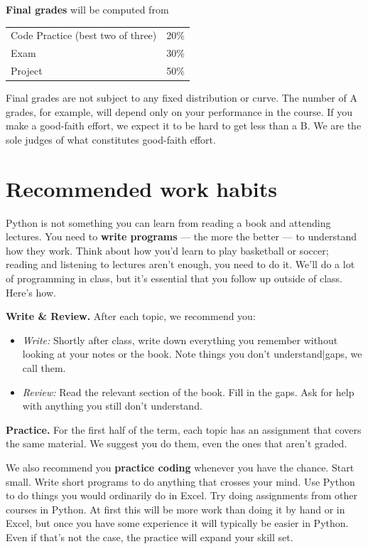 {\bf Final grades\/} will be computed from
\begin{center}
\begin{tabular}{ll}
Code Practice (best two of three) & 20\% \\
Exam        & 30\% \\
Project     & 50\% \\
\end{tabular}
\end{center}

Final grades are not subject to any fixed distribution or curve.
The number of A grades, for example,
will depend only on your performance in the course.
If you make a good-faith effort,
we expect it to be hard to get less than a B.
We are the sole judges of what constitutes good-faith effort.


\section*{Recommended work habits}

Python is not something you can learn from reading a book and attending lectures.
You need to {\bf write programs\/} ---
the more the better --- to understand how they work.
Think about how you'd learn to play basketball or soccer;
reading and listening to lectures aren't enough, you need to do it.
We'll do a lot of programming in class, but it's {essential\/} that you
follow up outside of class.
Here's how.

{\bf Write \& Review.\/}
After each topic, we recommend you:
\begin{itemize}
\item {\it Write:\/}  Shortly after class, write down everything you remember
without looking at your notes or the book. Note things you don't understand|gaps, we call them.

\item {\it Review:\/} Read the relevant section of the book.  Fill in the gaps. Ask for help with anything you still don't understand.
\end{itemize}

{\bf Practice.\/}
For the first half of the term, each topic has an assignment that covers the same material.
We suggest you do them, even the ones that aren't graded.

We also recommend you {\bf practice coding\/} whenever you have the chance.
Start small. Write short programs to do anything that crosses your mind.
Use Python to do things you would ordinarily do in Excel.
Try doing assignments from other courses in Python.
At first this will be more work than doing it by hand or in Excel,
but once you have some experience it will typically be easier in Python.
Even if that's not the case, the practice will expand your skill set.


